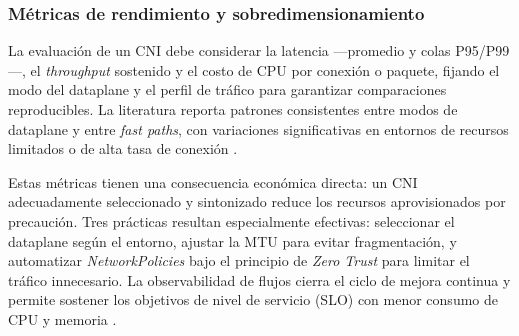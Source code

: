 \subsubsection{Métricas de rendimiento y sobredimensionamiento}

La evaluación de un CNI debe considerar la latencia ---promedio y colas P95/P99---, el \emph{throughput} sostenido y el costo de CPU por conexión o paquete, fijando el modo del dataplane y el perfil de tráfico para garantizar comparaciones reproducibles. La literatura reporta patrones consistentes entre modos de dataplane y entre \emph{fast paths}, con variaciones significativas en entornos de recursos limitados o de alta tasa de conexión \cite{ref7,ref8,ref9,ref11,ref22,ref27}.

Estas métricas tienen una consecuencia económica directa: un CNI adecuadamente seleccionado y sintonizado reduce los recursos aprovisionados por precaución. Tres prácticas resultan especialmente efectivas: seleccionar el dataplane según el entorno, ajustar la MTU para evitar fragmentación, y automatizar \emph{NetworkPolicies} bajo el principio de \emph{Zero Trust} para limitar el tráfico innecesario. La observabilidad de flujos cierra el ciclo de mejora continua y permite sostener los objetivos de nivel de servicio (SLO) con menor consumo de CPU y memoria \cite{ref7,ref8,ref12,ref23,ref24,ref25}.
